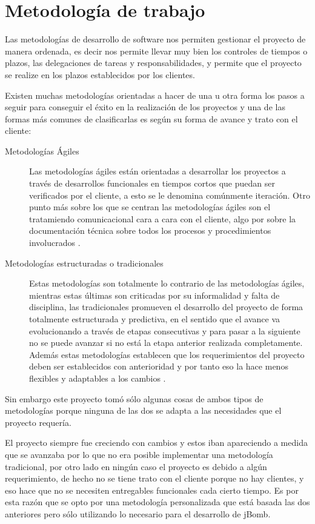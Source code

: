 \documentclass[a4paper,12pt,openany,oneside]{book}
\begin{document}
\chapter{Metodología de trabajo}
Las metodologías de desarrollo de software nos permiten gestionar el proyecto de manera ordenada, es decir nos permite llevar muy bien los controles de tiempos o plazos, las delegaciones de tareas y responsabilidades, y permite que el proyecto se realize en los plazos establecidos por los clientes.

Existen muchas metodologías orientadas a hacer de una u otra forma los pasos a seguir para conseguir el éxito en la realización de los proyectos y una de las formas más comunes de clasificarlas es según su forma de avance y trato con el cliente:
\begin{description}
\item[Metodologías Ágiles] Las metodologías ágiles están orientadas a desarrollar los proyectos a través de desarrollos funcionales en tiempos cortos que puedan ser verificados por el cliente, a esto se le denomina comúnmente iteración. Otro punto más sobre los que se centran las metodologías ágiles son el tratamiendo comunicacional cara a cara con el cliente, algo por sobre la documentación técnica sobre todos los procesos y procedimientos involucrados \cite{WIKI}.
\item[Metodologías estructuradas o tradicionales] Estas metodologías son totalmente lo contrario de las metodologías ágiles, mientras estas últimas son criticadas por su informalidad y falta de disciplina, las tradicionales promueven el desarrollo del proyecto de forma totalmente estructurada y predictiva, en el sentido que el avance va evolucionando a través de etapas consecutivas y para pasar a la siguiente no se puede avanzar si no está la etapa anterior realizada completamente. Además estas metodologías establecen que los requerimientos del proyecto deben ser establecidos con anterioridad y por tanto eso la hace menos flexibles y adaptables a los cambios \cite{WIKI}.
\end{description}
Sin embargo este proyecto tomó sólo algunas cosas de ambos tipos de metodologías porque ninguna de las dos se adapta a las necesidades que el proyecto requería. 

El proyecto siempre fue creciendo con cambios y estos iban apareciendo a medida que se avanzaba por lo que no era posible implementar una metodología tradicional, por otro lado en ningún caso el proyecto es debido a algún requerimiento, de hecho no se tiene trato con el cliente porque no hay clientes, y eso hace que no se necesiten entregables funcionales cada cierto tiempo. Es por esta razón que se opto por una metodología personalizada que está basada las dos anteriores pero sólo utilizando lo necesario para el desarrollo de jBomb.
\end{document}
